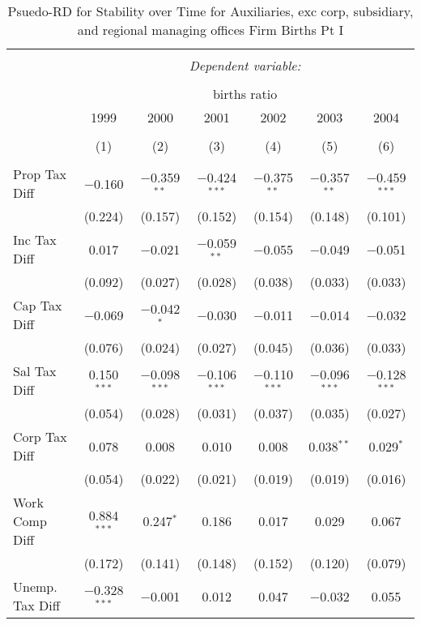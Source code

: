 
\begin{table}[!htbp] \centering 
  \caption{Psuedo-RD for Stability over Time for  Auxiliaries, exc corp, subsidiary, and regional managing offices Firm Births Pt I} 
  \label{95year} 
\small 
\begin{tabular}{@{\extracolsep{5pt}}lcccccc} 
\\[-1.8ex]\hline 
\hline \\[-1.8ex] 
 & \multicolumn{6}{c}{\textit{Dependent variable:}} \\ 
\cline{2-7} 
\\[-1.8ex] & \multicolumn{6}{c}{births ratio} \\ 
 & 1999 & 2000 & 2001 & 2002 & 2003 & 2004 \\ 
\\[-1.8ex] & (1) & (2) & (3) & (4) & (5) & (6)\\ 
\hline \\[-1.8ex] 
 Prop Tax Diff & $-$0.160 & $-$0.359$^{**}$ & $-$0.424$^{***}$ & $-$0.375$^{**}$ & $-$0.357$^{**}$ & $-$0.459$^{***}$ \\ 
  & (0.224) & (0.157) & (0.152) & (0.154) & (0.148) & (0.101) \\ 
  Inc Tax Diff & 0.017 & $-$0.021 & $-$0.059$^{**}$ & $-$0.055 & $-$0.049 & $-$0.051 \\ 
  & (0.092) & (0.027) & (0.028) & (0.038) & (0.033) & (0.033) \\ 
  Cap Tax Diff & $-$0.069 & $-$0.042$^{*}$ & $-$0.030 & $-$0.011 & $-$0.014 & $-$0.032 \\ 
  & (0.076) & (0.024) & (0.027) & (0.045) & (0.036) & (0.033) \\ 
  Sal Tax Diff & 0.150$^{***}$ & $-$0.098$^{***}$ & $-$0.106$^{***}$ & $-$0.110$^{***}$ & $-$0.096$^{***}$ & $-$0.128$^{***}$ \\ 
  & (0.054) & (0.028) & (0.031) & (0.037) & (0.035) & (0.027) \\ 
  Corp Tax Diff & 0.078 & 0.008 & 0.010 & 0.008 & 0.038$^{**}$ & 0.029$^{*}$ \\ 
  & (0.054) & (0.022) & (0.021) & (0.019) & (0.019) & (0.016) \\ 
  Work Comp Diff & 0.884$^{***}$ & 0.247$^{*}$ & 0.186 & 0.017 & 0.029 & 0.067 \\ 
  & (0.172) & (0.141) & (0.148) & (0.152) & (0.120) & (0.079) \\ 
  Unemp. Tax Diff & $-$0.328$^{***}$ & $-$0.001 & 0.012 & 0.047 & $-$0.032 & 0.055 \\ 

\end{tabular}
\end{table}
